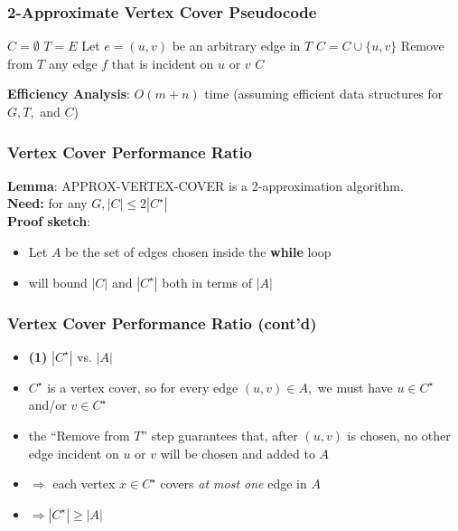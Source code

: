 \documentclass{beamer}
\begin{document}
      \begin{frame} \frametitle{2-Approximate Vertex Cover Pseudocode}
        \begin{algorithmic}[1]
            \State $C=\emptyset$
            \State $T=E$ 
              \State Let $e=(u, v)$ be an arbitrary edge in $T$
              \State $C = C \cup \{u, v \}$
              \State Remove from $T$ any edge $f$ that is incident on $u$ or $v$
            \EndWhile
            \State \Return $C$
          \EndFunction
        \end{algorithmic}
      \vspace{.5cm}
      \textbf{Efficiency Analysis}: $O(m+n)$ time (assuming efficient data structures
      for $G, T,$ and $C$)
      \end{frame}
      
      \begin{frame} \frametitle{Vertex Cover Performance Ratio}
      \textbf{Lemma}: APPROX-VERTEX-COVER is a 2-approximation algorithm. \\
      \textbf{Need:} for any $G, |C| \leq 2 |C^\star|$ \\
      \textbf{Proof sketch}:
      \begin{itemize}
        \item Let $A$ be the set of edges chosen inside the \textbf{while} loop
        \item will bound $|C|$ and $|C^\star|$ both in terms of $|A|$
      \end{itemize}
      \end{frame}
        
      \begin{frame} \frametitle{Vertex Cover Performance Ratio (cont'd)}
      \begin{itemize}
        \item \textbf{(1)} $|C^\star|$ vs. $|A|$
        \item $C^\star$ is a vertex cover, so for every edge $(u, v) \in A,$ we must have
          $u \in C^\star$ and/or $v \in C^\star$
        \item the ``Remove from $T$'' step guarantees that, after $(u, v)$ is chosen,
          no other edge incident on $u$ or $v$ will be chosen and added to $A$
        \item $\Rightarrow$ each vertex $x \in C^\star$ covers \emph{at most one} edge in $A$
        \item $\Rightarrow |C^\star| \geq |A|$
      \end{itemize}
      \end{frame}
      
\end{document}
